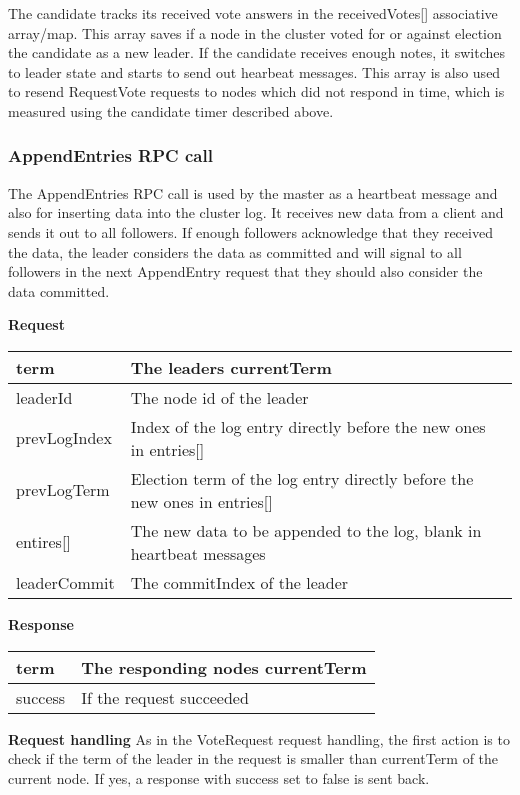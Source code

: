 The candidate tracks its received vote answers in the receivedVotes[] associative array/map. This array
saves if a node in the cluster voted for or against election the candidate as a new leader. If
the candidate receives enough notes, it switches to leader state and starts to send out hearbeat messages. This array is also used to resend RequestVote requests to nodes which did not respond in time,
which is measured using the candidate timer described above.

\subsubsection*{AppendEntries RPC call}
The AppendEntries RPC call is used by the master as a heartbeat message and also for
inserting data into the cluster log. It receives new data from a client and sends it out
to all followers. If enough followers acknowledge that they received the data, the leader
considers the data as committed and will signal to all followers in the next AppendEntry request 
that they should also consider the data committed.

\textbf{Request}

\begin{tabular}{ | l | p{12.7cm} | }
\hline
term &  The leaders currentTerm \\ \hline
leaderId & The node id of the leader \\ \hline
prevLogIndex & Index of the log entry directly before the new ones in entries[] \\ \hline
prevLogTerm &  Election term of the log entry directly before the new ones in entries[] \\ \hline
entires[] &  The new data to be appended to the log, blank in heartbeat messages \\ \hline
leaderCommit &  The commitIndex of the leader \\ \hline
\end{tabular}

\textbf{Response}

\begin{tabular}{ | l | p{13.7cm} | }
\hline
term & The responding nodes currentTerm \\ \hline
success & If the request succeeded \\ \hline
\end{tabular}

\textbf{Request handling}
As in the VoteRequest request handling, the first action is to check if the term of the
leader in the request is smaller than currentTerm of the current node. If yes, a response with success
set to false is sent back.

